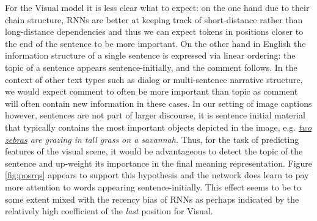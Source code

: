 For the {\sc Visual} model it is less clear what to
expect: on the one hand due to their chain structure,  
RNNs are better at keeping track of
short-distance rather than long-distance dependencies and thus we can expect 
tokens in positions closer to the end of the sentence to be more important. 
On the other hand in English the information structure of a single
sentence is expressed via linear ordering: the {\sc topic} of a 
sentence appears sentence-initially, and the {\sc comment} follows. 
In the context of other text types such as dialog or multi-sentence \label{edit:topiccomment}
narrative structure, we would expect {\sc comment} to often be more
important than {\sc topic} as {\sc comment} will often 
contain new information in these cases. In our setting of image captions 
however, sentences are not part of larger discourse, it is sentence
initial material that typically contains the most important 
objects depicted in the image, e.g. {\it {\underline{two zebras}} are grazing in tall grass on a savannah.}
Thus, for the task of predicting features of the visual scene, it would 
be advantageous to detect the topic of the sentence and up-weight its
importance in the final meaning representation. Figure \ref{fig:posrqs}
appears to support this hypothesis and the network does 
learn to pay more attention to  words appearing
sentence-initially. This effect seems to be to some extent mixed with the recency
bias of RNNs as perhaps indicated by the relatively high coefficient of the {\it last}
position for {\sc Visual}. 





